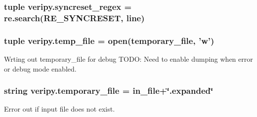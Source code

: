 \hypertarget{namespaceveripy_a69ba54ab5fdc8fc7d6575a37675bdb8d}{
\subsubsection[{syncreset\-\_\-regex}]{\setlength{\rightskip}{0pt plus 5cm}tuple veripy.\-syncreset\-\_\-regex = re.\-search(R\-E\-\_\-\-S\-Y\-N\-C\-R\-E\-S\-E\-T, {\bf line})}}\label{namespaceveripy_a69ba54ab5fdc8fc7d6575a37675bdb8d}
\hypertarget{namespaceveripy_a3c84020f008e06bdb41e3f89811b8fc5}{
\subsubsection[{temp\-\_\-file}]{\setlength{\rightskip}{0pt plus 5cm}tuple veripy.\-temp\-\_\-file = open({\bf temporary\-\_\-file}, 'w')}}\label{namespaceveripy_a3c84020f008e06bdb41e3f89811b8fc5}


Wrting out temporary\-\_\-file for debug T\-O\-D\-O\-: Need to enable dumping when error or debug mode enabled. 

\hypertarget{namespaceveripy_afad07aa9410aaa39c3a55e59c48c67d2}{
\subsubsection[{temporary\-\_\-file}]{\setlength{\rightskip}{0pt plus 5cm}string veripy.\-temporary\-\_\-file = {\bf in\-\_\-file}+\char`\"{}.expanded\char`\"{}}}\label{namespaceveripy_afad07aa9410aaa39c3a55e59c48c67d2}


Error out if input file does not exist. 

